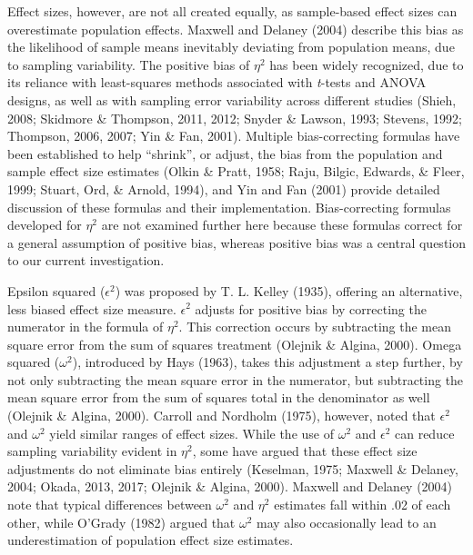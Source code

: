 \documentclass[english,man]{apa6}
\theoremstyle{definition}
\theoremstyle{definition}
\theoremstyle{definition}
\theoremstyle{remark}
\begin{document}
Effect sizes, however, are not all created equally, as sample-based
effect sizes can overestimate population effects. Maxwell and Delaney
(2004) describe this bias as the likelihood of sample means inevitably
deviating from population means, due to sampling variability. The
positive bias of \(\eta^2\) has been widely recognized, due to its
reliance with least-squares methods associated with \emph{t}-tests and
ANOVA designs, as well as with sampling error variability across
different studies (Shieh, 2008; Skidmore \& Thompson, 2011, 2012; Snyder
\& Lawson, 1993; Stevens, 1992; Thompson, 2006, 2007; Yin \& Fan, 2001).
Multiple bias-correcting formulas have been established to help
\enquote{shrink}, or adjust, the bias from the population and sample
effect size estimates (Olkin \& Pratt, 1958; Raju, Bilgic, Edwards, \&
Fleer, 1999; Stuart, Ord, \& Arnold, 1994), and Yin and Fan (2001)
provide detailed discussion of these formulas and their implementation.
Bias-correcting formulas developed for \(\eta^2\) are not examined
further here because these formulas correct for a general assumption of
positive bias, whereas positive bias was a central question to our
current investigation.

Epsilon squared (\(\epsilon^2\)) was proposed by T. L. Kelley (1935),
offering an alternative, less biased effect size measure. \(\epsilon^2\)
adjusts for positive bias by correcting the numerator in the formula of
\(\eta^2\). This correction occurs by subtracting the mean square error
from the sum of squares treatment (Olejnik \& Algina, 2000). Omega
squared (\(\omega^2\)), introduced by Hays (1963), takes this adjustment
a step further, by not only subtracting the mean square error in the
numerator, but subtracting the mean square error from the sum of squares
total in the denominator as well (Olejnik \& Algina, 2000). Carroll and
Nordholm (1975), however, noted that \(\epsilon^2\) and \(\omega^2\)
yield similar ranges of effect sizes. While the use of \(\omega^2\) and
\(\epsilon^2\) can reduce sampling variability evident in \(\eta^2\),
some have argued that these effect size adjustments do not eliminate
bias entirely (Keselman, 1975; Maxwell \& Delaney, 2004; Okada, 2013,
2017; Olejnik \& Algina, 2000). Maxwell and Delaney (2004) note that
typical differences between \(\omega^2\) and \(\eta^2\) estimates fall
within .02 of each other, while O'Grady (1982) argued that \(\omega^2\)
may also occasionally lead to an underestimation of population effect
size estimates.
\end{document}
